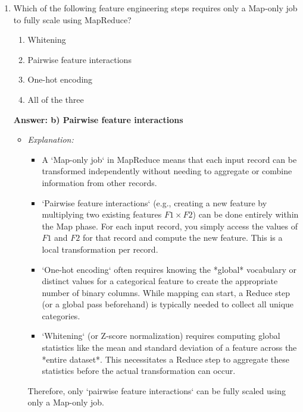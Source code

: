 \documentclass{article}
\begin{document}
\begin{enumerate}[label=\textbf{Question \arabic*.}]
    \item Which of the following feature engineering steps requires only a Map-only job to fully scale using MapReduce?
        \begin{enumerate}[label=\alph*)]
            \item Whitening
            \item Pairwise feature interactions
            \item One-hot encoding
            \item All of the three
        \end{enumerate}
        \textbf{Answer: b) Pairwise feature interactions}
        \begin{itemize}
            \item \textit{Explanation:}
            \begin{itemize}
                \item A `Map-only job` in MapReduce means that each input record can be transformed independently without needing to aggregate or combine information from other records.
                \item `Pairwise feature interactions` (e.g., creating a new feature by multiplying two existing features $F1 \times F2$) can be done entirely within the Map phase. For each input record, you simply access the values of $F1$ and $F2$ for that record and compute the new feature. This is a local transformation per record.
                \item `One-hot encoding` often requires knowing the *global* vocabulary or distinct values for a categorical feature to create the appropriate number of binary columns. While mapping can start, a Reduce step (or a global pass beforehand) is typically needed to collect all unique categories.
                \item `Whitening` (or Z-score normalization) requires computing global statistics like the mean and standard deviation of a feature across the *entire dataset*. This necessitates a Reduce step to aggregate these statistics before the actual transformation can occur.
            \end{itemize}
            Therefore, only `pairwise feature interactions` can be fully scaled using only a Map-only job.
        \end{itemize}
    

\end{enumerate}
\end{document}
